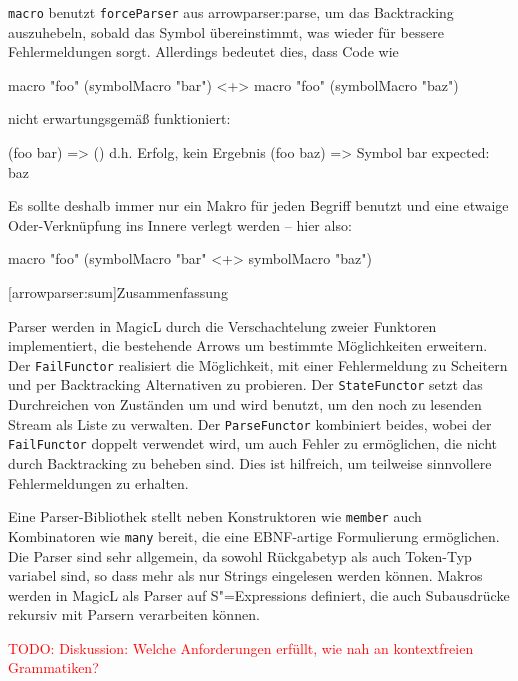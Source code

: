 \documentclass[12pt, a4paper, bibgerm]{scrbook}
\newenvironment{DIFnomarkup}{}{}
\newcommand\icode[1]{\lstinline?#1?}
\newcommand{\todo}[1]{
  \textcolor{red}{TODO: #1}
}
\newcommand\lsection{}
\newcommand\sref{}
\newcommand{\sexps}{S"=Expressions}
\begin{document}
\icode{macro} benutzt \icode{forceParser} aus
\sref{arrowparser:parse}, um das Backtracking auszuhebeln, sobald das
Symbol übereinstimmt, was wieder für bessere Fehlermeldungen
sorgt. Allerdings bedeutet dies, dass Code wie
\begin{DIFnomarkup}\begin{code}
macro "foo" (symbolMacro "bar") <+> macro "foo" (symbolMacro "baz")
\end{code}\end{DIFnomarkup}
nicht erwartungsgemäß funktioniert:
\begin{DIFnomarkup}\begin{code}
(foo bar)   => ()  d.h. Erfolg, kein Ergebnis
(foo baz)   => Symbol bar expected: baz
\end{code}\end{DIFnomarkup}
Es sollte deshalb immer nur ein Makro für jeden Begriff benutzt und
eine etwaige Oder-Verknüpfung ins Innere verlegt werden -- hier also:
\begin{DIFnomarkup}\begin{code}
macro "foo" (symbolMacro "bar" <+> symbolMacro "baz")
\end{code}\end{DIFnomarkup}

\lsection[arrowparser:sum]{Zusammenfassung}

Parser werden in MagicL durch die Verschachtelung zweier Funktoren
implementiert, die bestehende Arrows um bestimmte Möglichkeiten
erweitern. Der \icode{FailFunctor} realisiert die Möglichkeit, mit einer
Fehlermeldung zu Scheitern und per Backtracking Alternativen zu
probieren. Der \icode{StateFunctor} setzt das Durchreichen von Zuständen
um und wird benutzt, um den noch zu lesenden Stream als Liste zu
verwalten. Der \icode{ParseFunctor} kombiniert beides, wobei der
\icode{FailFunctor} doppelt verwendet wird, um auch Fehler zu
ermöglichen, die nicht durch Backtracking zu beheben sind. Dies ist
hilfreich, um teilweise sinnvollere Fehlermeldungen zu erhalten.

Eine Parser-Bibliothek stellt neben Konstruktoren wie \icode{member}
auch Kombinatoren wie \icode{many} bereit, die eine EBNF-artige
Formulierung ermöglichen. Die Parser sind sehr allgemein, da sowohl
Rückgabetyp als auch Token-Typ variabel sind, so dass mehr als nur
Strings eingelesen werden können. Makros werden in MagicL als Parser auf
\sexps{} definiert, die auch Subausdrücke rekursiv mit Parsern
verarbeiten können.

\todo{Diskussion: Welche Anforderungen erfüllt, wie nah an kontextfreien
Grammatiken?}
\end{document}
